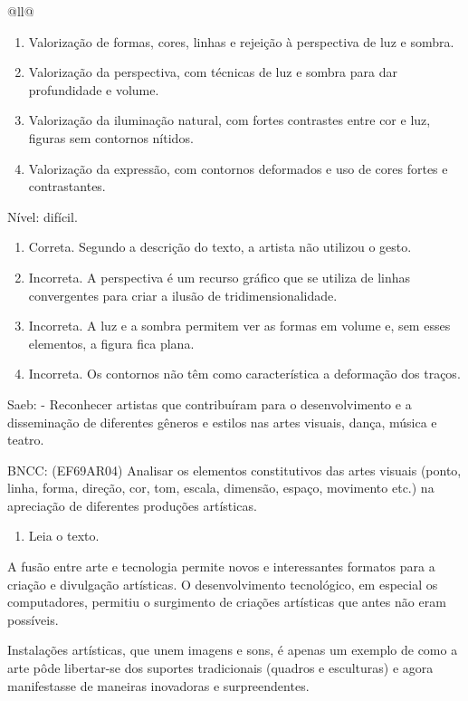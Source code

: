 \begin{itemize}
\begin{itemize}
\begin{escolha}[]{@{}ll@{}}
{{{{{{{{\begin{enumerate}
\def\labelenumi{\alph{enumi})}
\item
  Valorização de formas, cores, linhas e rejeição à perspectiva de luz e
  sombra.
\item
  Valorização da perspectiva, com técnicas de luz e sombra para dar
  profundidade e volume.
\item
  Valorização da iluminação natural, com fortes contrastes entre cor e
  luz, figuras sem contornos nítidos.
\item
  Valorização da expressão, com contornos deformados e uso de cores
  fortes e contrastantes.
\end{enumerate}

Nível: difícil.

\begin{enumerate}
\def\labelenumi{\alph{enumi})}
\item
  Correta. Segundo a descrição do texto, a artista não utilizou o gesto.
\item
  Incorreta. A perspectiva é um recurso gráfico que se utiliza de linhas
  convergentes para criar a ilusão de tridimensionalidade.
\item
  Incorreta. A luz e a sombra permitem ver as formas em volume e, sem
  esses elementos, a figura fica plana. ~
\item
  Incorreta. Os contornos não têm como característica a deformação dos
  traços.
\end{enumerate}

Saeb: - Reconhecer artistas que contribuíram para o desenvolvimento e a
disseminação de diferentes gêneros e estilos nas artes visuais, dança,
música e teatro.

BNCC: (EF69AR04) Analisar os elementos constitutivos das artes visuais
(ponto, linha, forma, direção, cor, tom, escala, dimensão, espaço,
movimento etc.) na apreciação de diferentes produções artísticas.

\begin{enumerate}
\def\labelenumi{\arabic{enumi}.}
\item
  Leia o texto.
\end{enumerate}

A fusão entre arte e tecnologia permite novos e interessantes formatos
para a criação e divulgação artísticas. O desenvolvimento tecnológico,
em especial os computadores, permitiu o surgimento de criações
artísticas que antes não eram possíveis.

Instalações artísticas, que unem imagens e sons, é apenas um exemplo de
como a arte pôde libertar-se dos suportes tradicionais (quadros e
esculturas) e agora manifestasse de maneiras inovadoras e
surpreendentes.

}}}}}}}}
\end{escolha}
\end{itemize}
\end{itemize}
